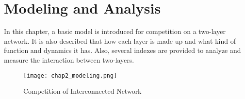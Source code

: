 
\chapter{Modeling and Analysis}
\label{chap2}
In this chapter, a basic model is introduced for competition on a two-layer network. It is also described that how each layer is made up and what kind of function and dynamics it has. Also, several indexes are provided to analyze and measure the interaction between two-layers.
\begin{figure}[!htb]
	\centering
	\texttt{[image: chap2\_modeling.png]}
	\caption{Competition of Interconnected Network}
	\label{chap2_modeling}
\end{figure}
 
